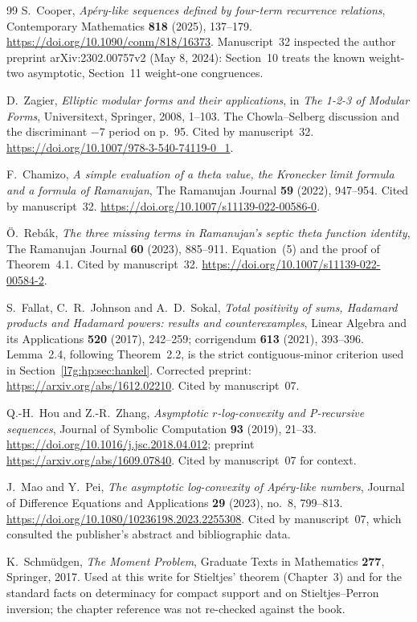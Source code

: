 \documentclass[11pt,letterpaper]{article}
\theoremstyle{remark}\newtheorem{remark}[theorem]{Remark}
\newcounter{l7gtrsavedeq}
\begin{document}
\begin{thebibliography}{99}
S.~Cooper,
\emph{Ap\'ery-like sequences defined by four-term recurrence relations},
Contemporary Mathematics \textbf{818} (2025), 137--179.
\url{https://doi.org/10.1090/conm/818/16373}. Manuscript~32 inspected the
author preprint arXiv:2302.00757v2 (May 8, 2024): Section~10 treats the
known weight-two asymptotic, Section~11 weight-one congruences.

D.~Zagier, \emph{Elliptic modular forms and their applications}, in
\emph{The 1-2-3 of Modular Forms}, Universitext, Springer, 2008, 1--103.
The Chowla--Selberg discussion and the discriminant $-7$ period on p.~95.
Cited by manuscript~32.
\url{https://doi.org/10.1007/978-3-540-74119-0_1}.

F.~Chamizo, \emph{A simple evaluation of a theta value, the Kronecker limit
formula and a formula of Ramanujan}, The Ramanujan Journal \textbf{59}
(2022), 947--954. Cited by manuscript~32.
\url{https://doi.org/10.1007/s11139-022-00586-0}.

\"O.~Reb\'ak, \emph{The three missing terms in Ramanujan's septic theta
function identity}, The Ramanujan Journal \textbf{60} (2023), 885--911.
Equation~(5) and the proof of Theorem~4.1. Cited by manuscript~32.
\url{https://doi.org/10.1007/s11139-022-00584-2}.

S.~Fallat, C.~R.~Johnson and A.~D.~Sokal,
\emph{Total positivity of sums, Hadamard products and Hadamard powers:
results and counterexamples}, Linear Algebra and its Applications
\textbf{520} (2017), 242--259; corrigendum \textbf{613} (2021), 393--396.
Lemma~2.4, following Theorem~2.2, is the strict contiguous-minor criterion
used in Section~\ref{l7g:hp:sec:hankel}. Corrected preprint:
\url{https://arxiv.org/abs/1612.02210}. Cited by manuscript~07.

Q.-H.~Hou and Z.-R.~Zhang,
\emph{Asymptotic $r$-log-convexity and P-recursive sequences},
Journal of Symbolic Computation \textbf{93} (2019), 21--33.
\url{https://doi.org/10.1016/j.jsc.2018.04.012}; preprint
\url{https://arxiv.org/abs/1609.07840}. Cited by manuscript~07 for context.

J.~Mao and Y.~Pei,
\emph{The asymptotic log-convexity of Ap\'ery-like numbers},
Journal of Difference Equations and Applications \textbf{29} (2023),
no.~8, 799--813. \url{https://doi.org/10.1080/10236198.2023.2255308}.
Cited by manuscript~07, which consulted the publisher's abstract and
bibliographic data.

K.~Schm\"udgen, \emph{The Moment Problem}, Graduate Texts in Mathematics
\textbf{277}, Springer, 2017. Used at this write for Stieltjes' theorem
(Chapter~3) and for the standard facts on determinacy for compact support
and on Stieltjes--Perron inversion; the chapter reference was not
re-checked against the book.

\end{thebibliography}
\end{document}
